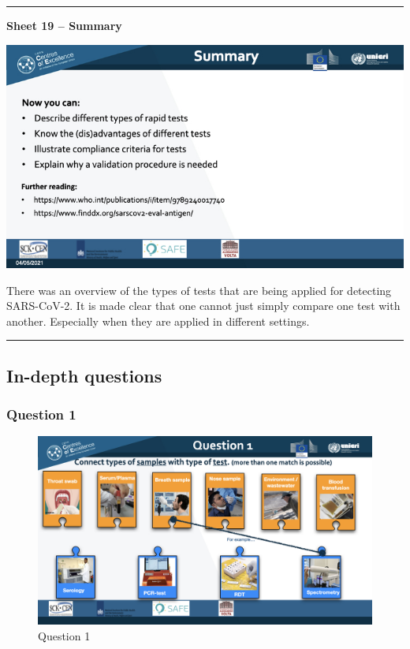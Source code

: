 \documentclass[
]{book}
\begin{document}
\begin{center}\rule{0.5\linewidth}{0.5pt}\end{center}

\textbf{Sheet 19 -- Summary}

\includegraphics{images/m02/m02_types_of_rapid_tests_final.019.jpeg}

There was an overview of the types of tests that are being applied for
detecting SARS-CoV-2. It is made clear that one cannot just simply
compare one test with another. Especially when they are applied in
different settings.

\begin{center}\rule{0.5\linewidth}{0.5pt}\end{center}

\hypertarget{in-depth-questions}{%
\subsection{In-depth questions}\label{in-depth-questions}}

\hypertarget{question-1}{%
\subsubsection{Question 1}\label{question-1}}

\begin{figure}
\centering
\includegraphics{images/m02/m02_questions_v2.001.jpeg}
\caption{Question 1}
\end{figure}
\end{document}
